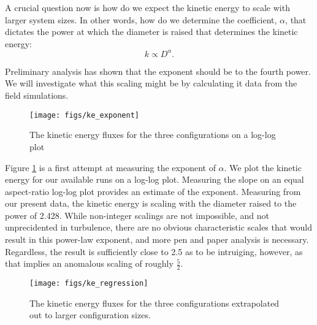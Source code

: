 \documentclass[english]{article}
\begin{document}

A crucial question now is how do we expect the kinetic energy to scale with larger system sizes. In other words, 
how do we determine the coefficient, $\alpha$, that dictates the power at which the diameter is raised that determines 
the kinetic energy: 
\begin{equation}
k \propto D^\alpha. 
\end{equation}

Preliminary analysis has shown that the exponent should be to the fourth power. We will investigate what this 
scaling might be by calculating it data from the field simulations. 

\begin{figure}[!htb]
  \begin{center}
    \texttt{[image: figs/ke\_exponent]}
    \caption{The kinetic energy fluxes for the three configurations on a
   log-log plot}
    \label{fig:ke_exponent}
  \end{center}
\end{figure}

Figure \ref{fig:ke_exponent} is a first attempt at measuring the
exponent of $\alpha$. We plot the kinetic energy for our available
runs on a log-log plot. Measuring the slope on an equal aspect-ratio log-log plot provides an estimate of the exponent. 
Measuring from our present data, the kinetic energy is scaling with the diameter raised to the power of 2.428. 
While non-integer scalings are not impossible, and not unprecidented in turbulence, there are no obvious characteristic scales that would 
result in this power-law exponent, and more pen and paper analysis is necessary. Regardless, the result is sufficiently close to 2.5 as to be
intruiging, however, as that implies an anomalous scaling of roughly $\frac{5}{2}$. 


\begin{figure}[!htb]
  \begin{center}
    \texttt{[image: figs/ke\_regression]}
    \caption{The kinetic energy fluxes for the three configurations extrapolated out to larger configuration sizes.}
    \label{fig:ke_regression}
  \end{center}
\end{figure}
\end{document}
